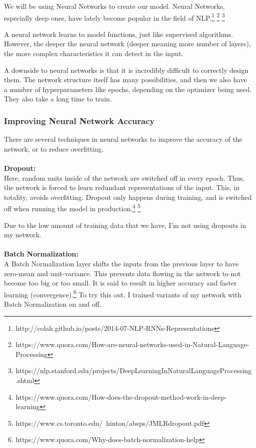 \documentclass{article}
\begin{document}
We will be using Neural Networks to create our model. Neural Networks, especially deep ones, have lately become popular in the field of NLP.\footnote{http://colah.github.io/posts/2014-07-NLP-RNNs-Representations} \footnote{https://www.quora.com/How-are-neural-networks-used-in-Natural-Language-Processing} \footnote{https://nlp.stanford.edu/projects/DeepLearningInNaturalLanguageProcessing.shtml}

A neural network learns to model functions, just like supervised algorithms. However, the deeper the neural network (deeper meaning more number of layers), the more complex characteristics it can detect in the input.

A downside to neural networks is that it is incredibly difficult to correctly design them. The network structure itself has many possibilities, and then we also have a number of hyperparameters like epochs, depending on the optimizer being used. They also take a long time to train.

\subsubsection{Improving Neural Network Accuracy}

There are several techniques in neural networks to improve the accuracy of the network, or to reduce overfitting.
\\\\
\textbf{Dropout:}\\
Here, random units inside of the network are switched off in every epoch. Thus, the network is forced to learn redundant representations of the input. This, in totality, avoids overfitting. Dropout only happens during training, and is switched off when running the model in production.\footnote{https://www.quora.com/How-does-the-dropout-method-work-in-deep-learning} \footnote{https://www.cs.toronto.edu/~hinton/absps/JMLRdropout.pdf}

Due to the low amount of training data that we have, I'm not using dropouts in my network.
\\\\
\textbf{Batch Normalization:}\\
A Batch Normalization layer shifts the inputs from the previous layer to have zero-mean and unit-variance. This prevents data flowing in the network to not become too big or too small. It is said to result in higher accuracy and faster learning (convergence).\footnote{https://www.quora.com/Why-does-batch-normalization-help} To try this out, I trained variants of my network with Batch Normalization on and off.
\end{document}
